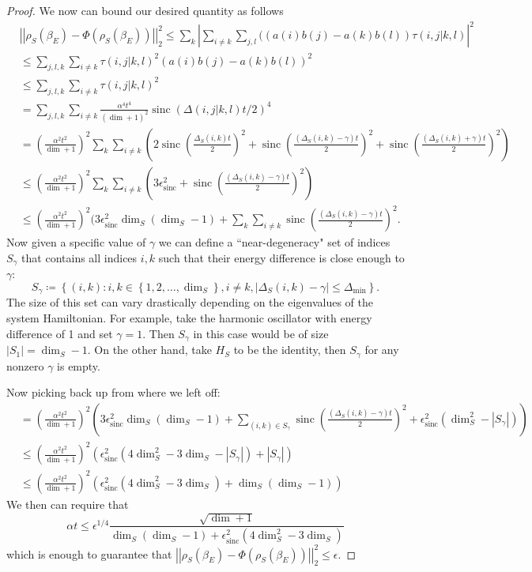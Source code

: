 \documentclass{article}
\newcommand{\parens}[1]{\left( #1 \right)}
\newcommand{\abs}[1]{\left| #1 \right|}
\newcommand{\norm}[1]{\left| \left| #1 \right| \right|}
\newcommand{\set}[1]{\left\{ #1 \right\}}
\DeclareMathOperator{\sinc}{sinc}
\begin{document}
\begin{proof}
We now can bound our desired quantity as follows
\begin{align}
    &\norm{\rho_S(\beta_E) - \Phi(\rho_S(\beta_E))}_2^2 \leq \sum_{k} \abs{\sum_{i \neq k} \sum_{j,l} ((a(i) b(j) -a(k) b(l)) \tau(i,j|k,l)}^2 \\
    &\leq \sum_{j,l,k} \sum_{i \neq k} \tau(i,j|k,l)^2 (a(i) b(j) - a(k) b(l))^2 \\
    &\leq \sum_{j,l,k} \sum_{i \neq k} \tau(i,j|k,l)^2 \\
    &= \sum_{j,l,k} \sum_{i \neq k} \frac{\alpha^4 t^4}{(\dim + 1)^2} \sinc(\Delta(i,j|k,l) t/ 2)^4 \\
    &= \parens{\frac{\alpha^2 t^2}{\dim + 1}}^2 \sum_k \sum_{i \neq k} \parens{2 \sinc\parens{ \frac{\Delta_S(i,k) t}{2}}^2 + \sinc\parens{\frac{(\Delta_S(i,k) - \gamma)t}{2}}^2 + \sinc\parens{\frac{(\Delta_S(i,k) + \gamma)t}{2}}^2} \\
    &\leq \parens{\frac{\alpha^2 t^2}{\dim + 1}}^2 \sum_k \sum_{i \neq k} \parens{3 \epsilon_{\sinc}^2 + \sinc\parens{\frac{(\Delta_S(i,k) - \gamma)t}{2}}^2} \\
    &\leq \parens{\frac{\alpha^2 t^2}{\dim + 1}}^2 (3 \epsilon_{\sinc}^2 \dim_S (\dim_S - 1) + \sum_{k} \sum_{i \neq k} \sinc\parens{\frac{(\Delta_S(i,k) - \gamma)t}{2}}^2.
\end{align}
Now given a specific value of $\gamma$ we can define a ``near-degeneracy" set of indices $S_\gamma$ that contains all indices $i,k$ such that their energy difference is close enough to $\gamma$:
\begin{equation}
    S_\gamma \coloneqq \set{(i,k) : i,k \in \set{1, 2, \ldots, \dim_S}, i \neq k, |\Delta_S(i,k) - \gamma| \leq \Delta_{\min}}.
\end{equation}
The size of this set can vary drastically depending on the eigenvalues of the system Hamiltonian. For example, take the harmonic oscillator with energy difference of 1 and set $\gamma = 1$. Then $S_{\gamma}$ in this case would be of size $|S_{1}| = \dim_S - 1$. On the other hand, take $H_S$ to be the identity, then $S_\gamma$ for any nonzero $\gamma$ is empty. 

Now picking back up from where we left off:
\begin{align}
    &= \parens{\frac{\alpha^2 t^2}{\dim + 1}}^2 (3 \epsilon_{\sinc}^2 \dim_S (\dim_S - 1) + \sum_{(i,k) \in S_{\gamma}} \sinc\parens{\frac{(\Delta_S(i,k) - \gamma)t}{2}}^2 + \epsilon_{\sinc}^2 (\dim_S^2 - |S_{\gamma}|)) \\
    &\leq \parens{\frac{\alpha^2 t^2}{\dim + 1}}^2 \parens{\epsilon_{\sinc}^2 (4 \dim_S^2 - 3 \dim_S - |S_{\gamma}|) + |S_{\gamma}|} \\
    &\leq \parens{\frac{\alpha^2 t^2}{\dim + 1}}^{2} \parens{\epsilon_{\sinc}^2 (4 \dim_S^2 - 3 \dim_S) + \dim_S(\dim_S - 1)}
\end{align}
We then can require that
\begin{equation}
    \alpha t \leq \epsilon^{1/4} \frac{\sqrt{\dim + 1}}{\dim_S (\dim_S - 1) + \epsilon_{\sinc}^2 (4 \dim_S^2 - 3 \dim_S)}
\end{equation}
which is enough to guarantee that $\norm{\rho_S(\beta_E) - \Phi(\rho_S(\beta_E))}_2^2 \leq \epsilon$. 
\end{proof}
\end{document}
